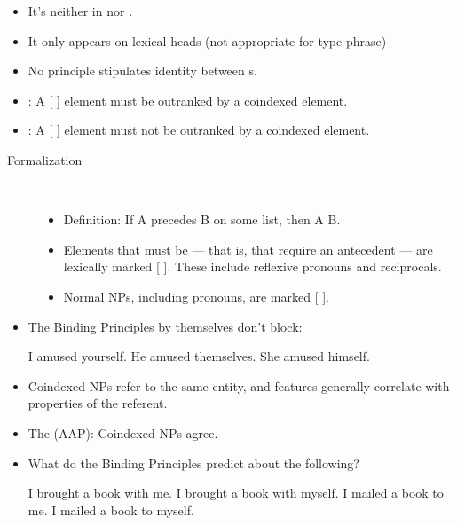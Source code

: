 \documentclass[a4paper,landscape,headrule,footrule]{foils}
\begin{document}
\begin{itemize}
\item It’s neither in  nor .
\item It only appears on lexical heads (not
appropriate for type phrase)
\item No principle stipulates identity
between s.
\end{itemize}

\begin{itemize}
\item {}: A [ ] element must be
outranked by a coindexed element.
\item {}: A [ ] element must not
be outranked by a coindexed element.
\end{itemize}

\begin{description}
\item [Formalization] ~\\[-2ex]
\begin{itemize}
\item Definition: If A precedes B on some  list,
then A  B.
\item Elements that must be  --- that is, that
require an antecedent --- are lexically marked
[ ]. These include reflexive pronouns
and reciprocals.  
\item Normal  NPs, including pronouns,  are marked [ ].
\end{itemize}
\end{description}

\begin{itemize}
\item The Binding Principles by themselves don’t block:
  \begin{exe}
    \ix * I amused yourself.
    \ix * He amused themselves.
    \ix * She amused himself.
  \end{exe}
\item Coindexed NPs refer to the same entity, and  features
generally correlate with properties of the referent.
\item The  (AAP):
Coindexed NPs agree.
\end{itemize}

\begin{itemize}
\item What do the Binding Principles predict about the
following?
  \begin{exe}
    \ix I brought a book with me.
    \ix *I brought a book with myself.
    \ix *I mailed a book to me.
    \ix I mailed a book to myself.
  \end{exe}
\end{itemize}
\end{document}
